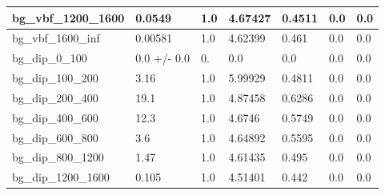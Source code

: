 \documentclass[a4paper, 10pt]{article}
\begin{document}
\begin{table}[H]
\begin{center}
\begin{tabular}{|m{23.0mm}|m{23.0mm}|m{18.0mm}|m{19.0mm}|m{19.0mm}|m{19.0mm}|m{19.0mm}|}
      \hline
      {\cellcolor{white}         bg\_vbf\_1200\_1600}& {\cellcolor{white}         0.0549}& {\cellcolor{white}         1.0}& {\cellcolor{white}         4.67427}& {\cellcolor{white}         0.4511}& {\cellcolor{green}         0.0}& {\cellcolor{green}         0.0}\\
      \hline
      {\cellcolor{white}         bg\_vbf\_1600\_inf}& {\cellcolor{white}         0.00581}& {\cellcolor{white}         1.0}& {\cellcolor{white}         4.62399}& {\cellcolor{white}         0.461}& {\cellcolor{green}         0.0}& {\cellcolor{green}         0.0}\\
      \hline
      {\cellcolor{white}         bg\_dip\_0\_100}& {\cellcolor{white}         0.0 +/\-- 0.0}& {\cellcolor{white}         0.}& {\cellcolor{white}         0.0}& {\cellcolor{white}         0.0}& {\cellcolor{green}         0.0}& {\cellcolor{green}         0.0}\\
      \hline
      {\cellcolor{white}         bg\_dip\_100\_200}& {\cellcolor{white}         3.16}& {\cellcolor{white}         1.0}& {\cellcolor{white}         5.99929}& {\cellcolor{white}         0.4811}& {\cellcolor{green}         0.0}& {\cellcolor{green}         0.0}\\
      \hline
      {\cellcolor{white}         bg\_dip\_200\_400}& {\cellcolor{white}         19.1}& {\cellcolor{white}         1.0}& {\cellcolor{white}         4.87458}& {\cellcolor{white}         0.6286}& {\cellcolor{green}         0.0}& {\cellcolor{green}         0.0}\\
      \hline
      {\cellcolor{white}         bg\_dip\_400\_600}& {\cellcolor{white}         12.3}& {\cellcolor{white}         1.0}& {\cellcolor{white}         4.6746}& {\cellcolor{white}         0.5749}& {\cellcolor{green}         0.0}& {\cellcolor{green}         0.0}\\
      \hline
      {\cellcolor{white}         bg\_dip\_600\_800}& {\cellcolor{white}         3.6}& {\cellcolor{white}         1.0}& {\cellcolor{white}         4.64892}& {\cellcolor{white}         0.5595}& {\cellcolor{green}         0.0}& {\cellcolor{green}         0.0}\\
      \hline
      {\cellcolor{white}         bg\_dip\_800\_1200}& {\cellcolor{white}         1.47}& {\cellcolor{white}         1.0}& {\cellcolor{white}         4.61435}& {\cellcolor{white}         0.495}& {\cellcolor{green}         0.0}& {\cellcolor{green}         0.0}\\
      \hline
      {\cellcolor{white}         bg\_dip\_1200\_1600}& {\cellcolor{white}         0.105}& {\cellcolor{white}         1.0}& {\cellcolor{white}         4.51401}& {\cellcolor{white}         0.442}& {\cellcolor{green}         0.0}& {\cellcolor{green}         0.0}\\

\end{tabular}
\end{center}
\end{table}
\end{document}
